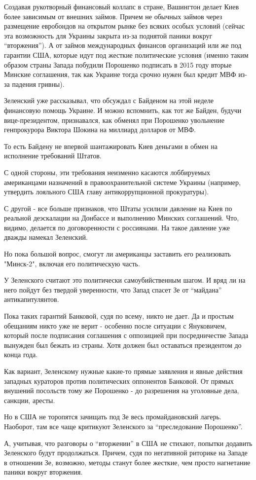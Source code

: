 Создавая рукотворный финансовый коллапс в стране, Вашингтон делает Киев более
зависимым от внешних займов. Причем не обычных займов через размещение
евробондов на открытом рынке без всяких особых условий (сейчас эта возможность
для Украины закрыта из-за поднятой паники вокруг \enquote{вторжения}). А от займов
международных финансов организаций или же под гарантии США, которые идут под
жесткие политические условия (именно таким образом страны Запада побудили
Порошенко подписать в 2015 году вторые Минские соглашения, так как Украине
тогда срочно нужен был кредит МВФ из-за падения гривны).

Зеленский уже рассказывал, что обсуждал с Байденом на этой неделе финансовую
помощь Украине. И можно вспомнить, как тот же Байден, будучи вице-президентом,
признавался, как обменял при Порошенко увольнение генпрокурора Виктора Шокина
на миллиард долларов от МВФ. 

То есть Байдену не впервой шантажировать Киев деньгами в обмен на исполнение
требований Штатов. 

С одной стороны, эти требования неизменно касаются лоббируемых американцами
назначений в правоохранительной системе Украины (например, утвердить лояльного
США главу антикоррупционной прокуратуры).

С другой - все больше признаков, что Штаты усилили давление на Киев по реальной
деэскалации на Донбассе и выполнению Минских соглашений. Что, видимо, делается
по договоренности с россиянами. На такое давление уже дважды намекал Зеленский.

Но пока большой вопрос, смогут ли американцы заставить его реализовать
"Минск-2", включая его политическую часть. 

У Зеленского считают это политически самоубийственным шагом. И вряд ли на него
пойдут без твердой уверенности, что Запад спасет Зе от \enquote{майдана}
антикапитулянтов.

Пока таких гарантий Банковой, судя по всему, никто не дает. Да и простым
обещаниям никто уже не верит - особенно после ситуации с Януковичем, который
после подписания соглашения с оппозицией при посредничестве Запада вынужден был
бежать из страны. Хотя должен был оставаться президентом до конца года. 

Как вариант, Зеленскому нужные какие-то прямые заявления и явные действия
западных кураторов против политических оппонентов Банковой. От прямых внушений
посольств тому же Порошенко - до разрешения на уголовные дела, санкции, аресты. 

Но в США не торопятся зачищать под Зе весь промайдановский лагерь. Наоборот,
там все чаще критикуют Зеленского за \enquote{преследование Порошенко}.

А, учитывая, что разговоры о \enquote{вторжении} в США не стихают, попытки додавить
Зеленского будут продолжаться. Причем, судя по негативной риторике на Западе в
отношении Зе, возможно, методы станут более жесткие, чем просто нагнетание
паники вокруг вторжения.

